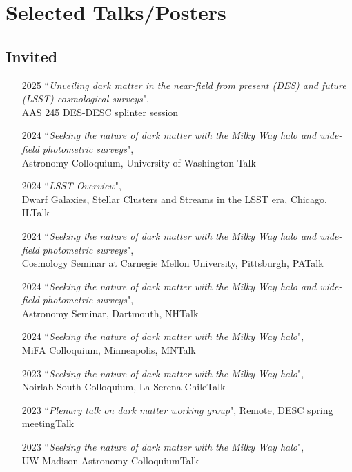 \documentclass[11pt,letterpaper, sans]{moderncv}        %
\begin{document}
\section{Selected Talks/Posters}
\subsection{Invited}
\begin{itemize}[itemsep=1pt, leftmargin=28pt]
    \item [2025] ``\textit{Unveiling dark matter in the near-field from present (DES) and future (LSST) cosmological surveys}",\\
    AAS 245 DES-DESC splinter session
    \item [2024] ``\textit{Seeking the nature of dark matter with the Milky Way halo and wide-field photometric surveys}", \\
    Astronomy Colloquium, University of Washington \hfill Talk
    \item [2024] ``\textit{LSST Overview}",\\
    Dwarf Galaxies, Stellar Clusters and Streams in the LSST era, Chicago, IL\hfill Talk
    \item [2024] ``\textit{Seeking the nature of dark matter with the Milky Way halo and wide-field photometric surveys}", \\
    Cosmology Seminar at Carnegie Mellon University, Pittsburgh, PA\hfill Talk
    \item [2024] ``\textit{Seeking the nature of dark matter with the Milky Way halo and wide-field photometric surveys}", \\
    Astronomy Seminar, Dartmouth, NH\hfill Talk
    \item [2024] ``\textit{Seeking the nature of dark matter with the Milky Way halo}", \\
    MiFA Colloquium, Minneapolis, MN\hfill Talk
    \item [2023] ``\textit{Seeking the nature of dark matter with the Milky Way halo}", \\
    Noirlab South Colloquium, La Serena Chile\hfill Talk
    \item [2023]``\textit{Plenary talk on dark matter working group}",
    Remote, DESC spring meeting\hfill Talk
    \item [2023] ``\textit{Seeking the nature of dark matter with the Milky Way halo}", \\
    UW Madison Astronomy Colloquium\hfill Talk

\end{itemize}
\end{document}
